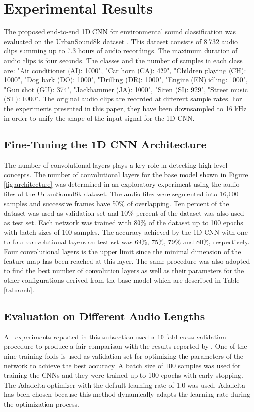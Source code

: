 \documentclass[preprint,final,12pt]{elsarticle}
\begin{document}
\section{Experimental Results}
\label{sec:res}
The proposed end-to-end 1D CNN for environmental sound classification was evaluated on the UrbanSound8k dataset \citep{Salamon:2014:DTU:2647868.2655045}. This dataset consists of 8,732 audio clips summing up to 7.3 hours of audio recordings. The maximum duration of audio clips is four seconds. The classes and the number of samples in each class are: "Air conditioner (AI): 1000", "Car horn (CA): 429", "Children playing (CH): 1000", "Dog bark (DO): 1000", "Drilling (DR): 1000", "Engine (EN) idling: 1000", "Gun shot (GU): 374", "Jackhammer (JA): 1000", "Siren (SI): 929", "Street music (ST): 1000". The original audio clips are recorded at different sample rates. For the experiments presented in this paper, they have been downsampled to 16 kHz in order to unify the shape of the input signal for the 1D CNN.  

\subsection{Fine-Tuning the 1D CNN Architecture}
The number of convolutional layers plays a key role in detecting high-level concepts. The number of convolutional layers for the base model shown in Figure \ref{fig:architecture} was determined in an exploratory experiment using the audio files of the UrbanSound8k dataset. The audio files were segmented into 16,000 samples and successive frames have 50\% of overlapping. Ten percent of the dataset was used as validation set and 10\% percent of the dataset was also used as test set. Each network was trained with 80\% of the dataset up to 100 epochs with batch sizes of 100 samples. The accuracy achieved by the 1D CNN with one to four convolutional layers on test set was 69\%, 75\%, 79\% and 80\%, respectively. Four convolutional layers is the upper limit since the minimal dimension of the feature map has been reached at this layer. The same procedure was also adopted to find the best number of convolution layers as well as their parameters for the other configurations derived from the base model which are described in Table \ref{tab:arch}.

\subsection{Evaluation on Different Audio Lengths}
\label{sec:diffleng}
All experiments reported in this subsection used a 10-fold cross-validation procedure to produce a fair comparison with the results reported by \citet{Salamon:2014:DTU:2647868.2655045}. One of the nine training folds is used as validation set for optimizing the parameters of the network to achieve the best accuracy. A batch size of 100 samples was used for training the CNNs and they were trained up to 100 epochs with early stopping. The Adadelta \citep{zeiler2012adadelta} optimizer with the default learning rate of 1.0 was used. Adadelta has been chosen because this method dynamically adapts the learning rate during the optimization process.
\end{document}
